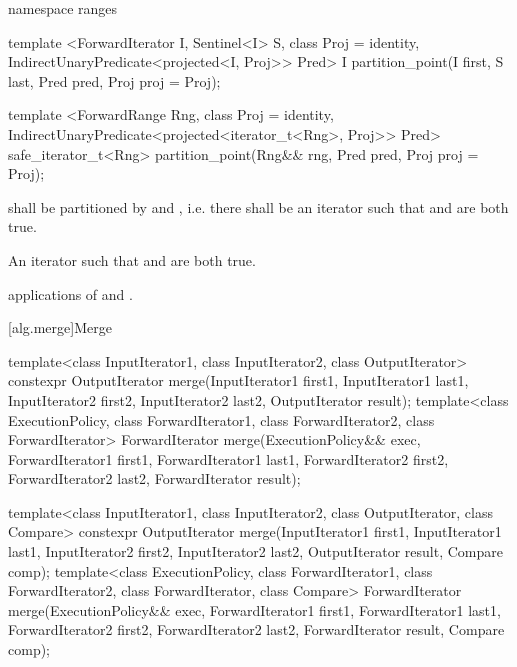 \begin{addedblock}
%
\begin{itemdecl}
namespace ranges {
  template <ForwardIterator I, Sentinel<I> S, class Proj = identity,
            IndirectUnaryPredicate<projected<I, Proj>> Pred>
    I partition_point(I first, S last, Pred pred, Proj proj = Proj{});

  template <ForwardRange Rng, class Proj = identity,
            IndirectUnaryPredicate<projected<iterator_t<Rng>, Proj>> Pred>
    safe_iterator_t<Rng> partition_point(Rng&& rng, Pred pred, Proj proj = Proj{});
}
\end{itemdecl}

\begin{itemdescr}
\pnum
\requires {} shall be partitioned by  and , i.e.
there shall be an iterator  such that
 and 
are both true.

\pnum
\returns An iterator  such that  and
 are both true.

\pnum
\complexity {} applications of  and .
\end{itemdescr}
\end{addedblock}

[alg.merge]{Merge}

%
\begin{itemdecl}
template<class InputIterator1, class InputIterator2,
         class OutputIterator>
  constexpr OutputIterator
    merge(InputIterator1 first1, InputIterator1 last1,
          InputIterator2 first2, InputIterator2 last2,
          OutputIterator result);
template<class ExecutionPolicy, class ForwardIterator1, class ForwardIterator2,
         class ForwardIterator>
  ForwardIterator
    merge(ExecutionPolicy&& exec,
          ForwardIterator1 first1, ForwardIterator1 last1,
          ForwardIterator2 first2, ForwardIterator2 last2,
          ForwardIterator result);

template<class InputIterator1, class InputIterator2,
         class OutputIterator, class Compare>
  constexpr OutputIterator
    merge(InputIterator1 first1, InputIterator1 last1,
          InputIterator2 first2, InputIterator2 last2,
          OutputIterator result, Compare comp);
template<class ExecutionPolicy, class ForwardIterator1, class ForwardIterator2,
         class ForwardIterator, class Compare>
  ForwardIterator
    merge(ExecutionPolicy&& exec,
          ForwardIterator1 first1, ForwardIterator1 last1,
          ForwardIterator2 first2, ForwardIterator2 last2,
          ForwardIterator result, Compare comp);
\end{itemdecl}

